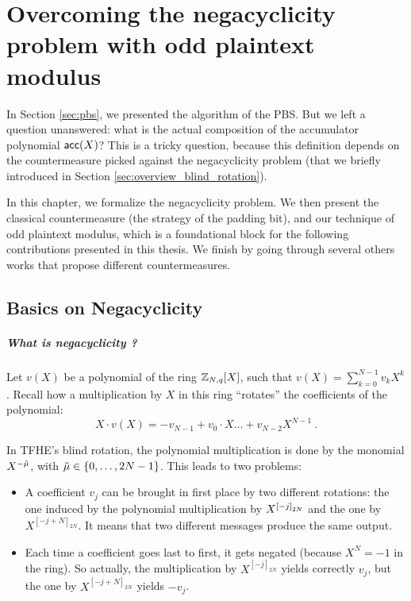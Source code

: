 
\chapter[The Negacyclicity Problem]{Overcoming the negacyclicity problem with odd plaintext modulus}
\label{chap:negacyclicity}


In Section \ref{sec:pbs}, we presented the algorithm of the PBS. But we left a question unanswered: what is the actual composition of the accumulator polynomial $\textsf{acc}(X)$? This is a tricky question, because this definition depends on the countermeasure picked against the negacyclicity problem (that we briefly introduced in Section \ref{sec:overview_blind_rotation}). 


In this chapter, we formalize the negacyclicity problem. We then present the classical countermeasure (the strategy of the padding bit), and our technique of odd plaintext modulus, which is a foundational block for the following contributions presented in this thesis. We finish by going through several others works that propose different countermeasures.


\section{Basics on Negacyclicity}

\paragraph{What is negacyclicity ?}

Let $v(X)$ be a polynomial of the ring $\mathbb{Z}_{N,q}[X]$, such that $v(X) = \sum_{k=0}^{N-1} v_k X^k$. Recall how a multiplication by $X$  in this ring ``rotates'' the coefficients of the polynomial: \[X \cdot v(X) = - v_{N - 1} + v_0 \cdot X \dots + v_{N - 2} X^{N - 1}~.\]

In TFHE's blind rotation, the polynomial multiplication is done by the monomial $X^{-\Tilde{\mu}}$, with $\Tilde{\mu} \in \left \lbrace 0, \dots, 2N - 1 \right \rbrace$. This leads to two problems:

\begin{itemize}
	\item A coefficient $v_j$ can be brought in first place by two different rotations: the one induced by the polynomial multiplication by $X^{\left [ -j \right ]_{2N}}$ and the one by $X^{[-j + N]_{2N}}$. It means that two different messages produce the same output.
	\item Each time a coefficient goes last to first, it gets negated (because $X^N = -1$ in the ring). So actually, the multiplication by $X^{[-j]_{2N}}$ yields correctly $v_j$, but the one by $X^{[-j + N]_{2N}}$ yields $-v_j$.
\end{itemize}


